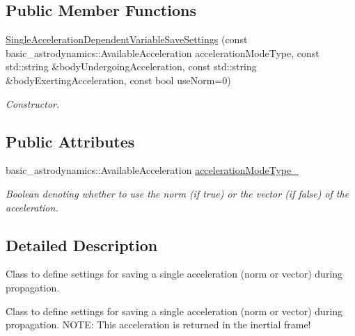 \subsection*{Public Member Functions}
\begin{DoxyCompactItemize}
\item 
\hyperlink{classtudat_1_1propagators_1_1SingleAccelerationDependentVariableSaveSettings_ad0f50d43f7db08da4ba1b828ac507638}{Single\+Acceleration\+Dependent\+Variable\+Save\+Settings} (const basic\+\_\+astrodynamics\+::\+Available\+Acceleration acceleration\+Mode\+Type, const std\+::string \&body\+Undergoing\+Acceleration, const std\+::string \&body\+Exerting\+Acceleration, const bool use\+Norm=0)
\begin{DoxyCompactList}\small\item\em Constructor. \end{DoxyCompactList}\end{DoxyCompactItemize}
\subsection*{Public Attributes}
\begin{DoxyCompactItemize}
\item 
basic\+\_\+astrodynamics\+::\+Available\+Acceleration \hyperlink{classtudat_1_1propagators_1_1SingleAccelerationDependentVariableSaveSettings_a80981b18fdd72ab98987b2427b183d02}{acceleration\+Mode\+Type\+\_\+}\hypertarget{classtudat_1_1propagators_1_1SingleAccelerationDependentVariableSaveSettings_a80981b18fdd72ab98987b2427b183d02}{}\label{classtudat_1_1propagators_1_1SingleAccelerationDependentVariableSaveSettings_a80981b18fdd72ab98987b2427b183d02}

\begin{DoxyCompactList}\small\item\em Boolean denoting whether to use the norm (if true) or the vector (if false) of the acceleration. \end{DoxyCompactList}\end{DoxyCompactItemize}


\subsection{Detailed Description}
Class to define settings for saving a single acceleration (norm or vector) during propagation. 

Class to define settings for saving a single acceleration (norm or vector) during propagation. N\+O\+TE\+: This acceleration is returned in the inertial frame! 

